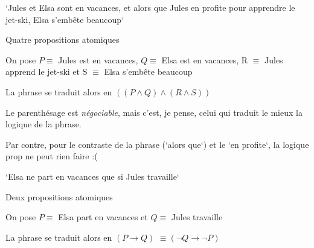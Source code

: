 \begin{frame}

`Jules et Elsa sont en vacances, et alors que Jules en profite pour apprendre le jet-ski, Elsa
s'embête beaucoup`\newline

Quatre propositions atomiques\newline

On pose $P \equiv $ Jules est en vacances, $Q \equiv $ Elsa est en vacances, R $\equiv$ Jules apprend le jet-ski et S $\equiv$ Elsa s'embête beaucoup\newline 

La phrase se traduit alors en $((P \wedge Q) \wedge (R \wedge S))$\pause\newline

Le parenthésage est \textit{négociable}, mais c'est, je pense, celui qui traduit le mieux la logique de la phrase.\pause\newline

Par contre, pour le contraste de la phrase (`alors que`) et le `en profite`, la logique prop ne peut rien faire :(

\vspace{0.5cm}

\end{frame}


\begin{frame}

`Elsa ne part en vacances que si Jules travaille`\pause\newline

Deux propositions atomiques\pause\newline

On pose $P \equiv $ Elsa part en vacances et $Q \equiv $ Jules travaille\pause\newline 

La phrase se traduit alors en $(P \rightarrow Q)$ \pause $\equiv (\neg Q \rightarrow \neg P)$
\end{frame}



